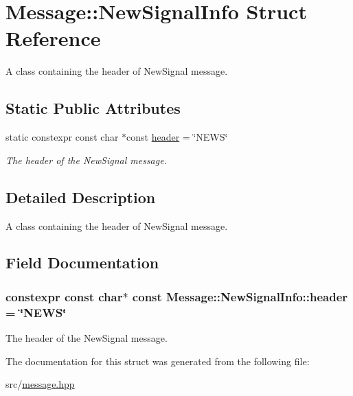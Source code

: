 \hypertarget{struct_message_1_1_new_signal_info}{}\section{Message\+:\+:New\+Signal\+Info Struct Reference}
\label{struct_message_1_1_new_signal_info}


A class containing the header of New\+Signal message.  


\subsection*{Static Public Attributes}
\begin{DoxyCompactItemize}
\item 
static constexpr const char $\ast$const \hyperlink{struct_message_1_1_new_signal_info_a5740f71d3d50d4bec68c80a5edebad25}{header} = \char`\"{}N\+E\+WS\char`\"{}
\begin{DoxyCompactList}\small\item\em The header of the New\+Signal message. \end{DoxyCompactList}\end{DoxyCompactItemize}


\subsection{Detailed Description}
A class containing the header of New\+Signal message. 

\subsection{Field Documentation}
\subsubsection[{\texorpdfstring{header}{header}}]{\setlength{\rightskip}{0pt plus 5cm}constexpr const char$\ast$ const Message\+::\+New\+Signal\+Info\+::header = \char`\"{}N\+E\+WS\char`\"{}\hspace{0.3cm}{\ttfamily [static]}}\hypertarget{struct_message_1_1_new_signal_info_a5740f71d3d50d4bec68c80a5edebad25}{}\label{struct_message_1_1_new_signal_info_a5740f71d3d50d4bec68c80a5edebad25}


The header of the New\+Signal message. 



The documentation for this struct was generated from the following file\+:\begin{DoxyCompactItemize}
\item 
src/\hyperlink{message_8hpp}{message.\+hpp}\end{DoxyCompactItemize}
